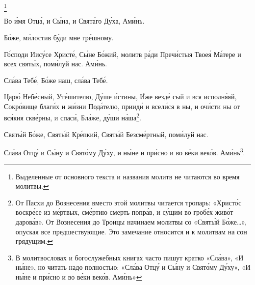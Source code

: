 \mychapterending


\begin{mymulticols}


\footnote{Выделенные от основного текста  и названия молитв не читаются во время молитвы.} 

Во \'{и}мя Отц\'{а}, и С\'{ы}на, и Свят\'{а}го Д\'{у}ха, Ам\'{и}нь.

\medskip {}


Б\'{о}же, м\'{и}лостив б\'{у}ди мне гр\'{е}шному. 


Г\'{о}споди Иис\'{у}се Христ\'{е}, С\'{ы}не Б\'{о}жий, молитв р\'{а}ди Преч\'{и}стыя Твое\'{я} М\'{а}тере и всех свят\'{ы}х, пом\'{и}луй нас. Ам\'{и}нь.

Сл\'{а}ва Теб\'{е}, Б\'{о}же наш, сл\'{а}ва Теб\'{е}.


Цар\'{ю} Неб\'{е}сный, Ут\'{е}шителю, Д\'{у}ше \'{и}стины, \'{И}же везд\'{е} сый и вся исполн\'{я}яй, Сокр\'{о}вище благ\'{и}х и ж\'{и}зни Под\'{а}телю, приид\'{и} и всел\'{и}ся в ны, и оч\'{и}сти ны от вс\'{я}кия скв\'{е}рны, и спас\'{и}, Бл\'{а}же, д\'{у}ши н\'{а}ша\footnote{От Пасхи до Вознесения вместо этой молитвы читается тропарь: «Христ\'{о}с воскр\'{е}се из м\'{е}ртвых, см\'{е}ртию смерть попр\'{а}в, и с\'{у}щим во гроб\'{е}х жив\'{о}т даров\'{а}в».  От Вознесения до Троицы начинаем молитвы со «Свят\'{ы}й Б\'{о}же\ldots», опуская все предшествующие.
Это замечание относится и к молитвам на сон грядущим.}.


Свят\'{ы}й Б\'{о}же, Свят\'{ы}й Кр\'{е}пкий, Свят\'{ы}й Безсм\'{е}ртный, пом\'{и}луй нас.  

Сл\'{а}ва Отц\'{у} и С\'{ы}ну и Свят\'{о}му Д\'{у}ху, и н\'{ы}не и пр\'{и}сно и во в\'{е}ки век\'{о}в. Ам\'{и}нь\footnote{В молитвословах и богослужебных книгах часто пишут кратко «Сл\'{а}ва», «И н\'{ы}не», но читать надо полностью: «Сл\'{а}ва Отц\'{у} и С\'{ы}ну и Свят\'{о}му Д\'{у}ху», «И н\'{ы}не и пр\'{и}сно и во в\'{е}ки век\'{о}в. Ам\'{и}нь»}.


\end{mymulticols}
